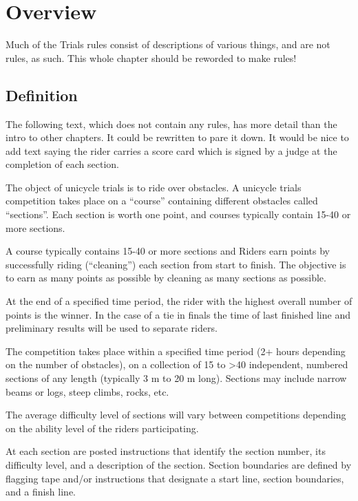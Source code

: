 \chapter{Overview}

\begin{comment2016}
Much of the Trials rules consist of descriptions of various things, and are not rules, as such.
This whole chapter should be reworded to make rules!
\end{comment2016}

\section{Definition}

\begin{comment2016}
The following text, which does not contain any rules, has more detail than the intro to other chapters.
It could be rewritten to pare it down.
It would be nice to add text saying the rider carries a score card which is signed by a judge at the completion of each section.
\end{comment2016}

The object of unicycle trials is to ride over obstacles.
A unicycle trials competition takes place on a ``course'' containing different obstacles called ``sections''.
Each section is worth one point, and courses typically contain 15-40 or more sections.

A course typically contains 15-40 or more sections and Riders earn points by successfully riding (``cleaning'') each section from start to finish.
The objective is to earn as many points as possible by cleaning as many sections as possible.

At the end of a specified time period, the rider with the highest overall number of points is the winner.
In the case of a tie in finals the time of last finished line and preliminary results will be used to separate riders.

The competition takes place within a specified time period (2+ hours depending on the number of obstacles), on a collection of 15 to >40 independent, numbered sections of any length (typically 3 m to 20 m long).
Sections may include narrow beams or logs, steep climbs, rocks, etc.

The average difficulty level of sections will vary between competitions depending on the ability level of the riders participating.

At each section are posted instructions that identify the section number, its difficulty level, and a description of the section.
Section boundaries are defined by flagging tape and/or instructions that designate a start line, section boundaries, and a finish line.

